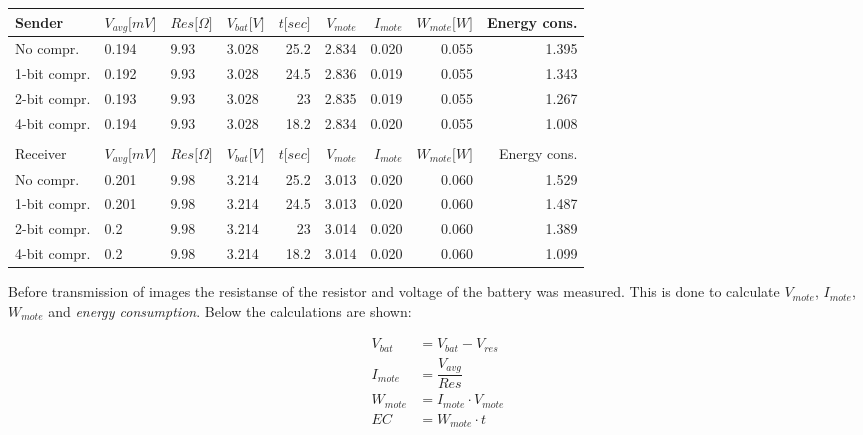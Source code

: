 \begin{tabular}{l l l l r r r r r}
	Sender           	& $V_{avg}\lbrack mV\rbrack$ & $Res\lbrack \Omega\rbrack$ & $V_{bat}\lbrack V\rbrack$ & $t\lbrack sec\rbrack$ & $V_{mote}$  & $I_{mote}$ & $W_{mote}\lbrack W\rbrack$ & Energy cons.\\ \hline
	No compr.	 & 0.194 & 9.93 & 3.028 & 25.2 & 2.834 & 0.020 & 0.055 & 1.395 \\
	1-bit compr. & 0.192 & 9.93 & 3.028 & 24.5 & 2.836 & 0.019 & 0.055 & 1.343 \\
	2-bit compr. & 0.193 & 9.93 & 3.028 & 23   & 2.835 & 0.019 & 0.055 & 1.267 \\
	4-bit compr. & 0.194 & 9.93 & 3.028 & 18.2 & 2.834 & 0.020 & 0.055 & 1.008 \\
	
	&&&&&&&& \\

	Receiver           	& $V_{avg}\lbrack mV\rbrack$ & $Res\lbrack \Omega\rbrack$ & $V_{bat}\lbrack V\rbrack$ & $t\lbrack sec\rbrack$ & $V_{mote}$  & $I_{mote}$ & $W_{mote}\lbrack W\rbrack$ & Energy cons.\\ \hline
	No compr.	 & 0.201 & 9.98 & 3.214 & 25.2 & 3.013 & 0.020 & 0.060 & 1.529 \\
	1-bit compr. & 0.201 & 9.98 & 3.214 & 24.5 & 3.013 & 0.020 & 0.060 & 1.487 \\
	2-bit compr. & 0.2   & 9.98 & 3.214 & 23   & 3.014 & 0.020 & 0.060 & 1.389 \\
	4-bit compr. & 0.2   & 9.98 & 3.214 & 18.2 & 3.014 & 0.020 & 0.060 & 1.099
\end{tabular}

Before transmission of images the resistanse of the resistor and voltage of the battery was measured. This is done to calculate $V_{mote}$, $I_{mote}$, $W_{mote}$ and \emph{energy consumption}. Below the calculations are shown:
 
\begin{align*}
	V_{bat}&=V_{bat}-V_{res}\\
	I_{mote}&= \dfrac{V_{avg}}{Res}\\
	W_{mote}&=I_{mote}\cdot V_{mote} \\
	EC&=W_{mote}\cdot t
\end{align*}